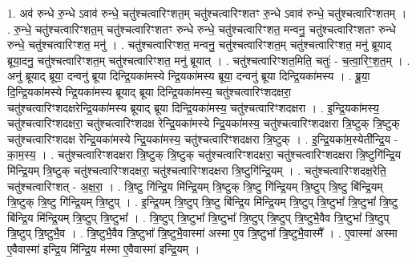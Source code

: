 \documentclass[17pt]{extarticle}
\begin{document}
1. अव॑ रुन्धे रु॒न्धे ऽवाव॑ रुन्धे॒ चतु॑श्चत्वारिꣳशत॒म् चतु॑श्चत्वारिꣳशतꣳ रु॒न्धे ऽवाव॑ रुन्धे॒ चतु॑श्चत्वारिꣳशतम् । . रु॒न्धे॒ चतु॑श्चत्वारिꣳशत॒म् चतु॑श्चत्वारिꣳशतꣳ रुन्धे रुन्धे॒ चतु॑श्चत्वारिꣳशत॒ मन्वनु॒ चतु॑श्चत्वारिꣳशतꣳ रुन्धे रुन्धे॒ चतु॑श्चत्वारिꣳशत॒ मनु॑ । . चतु॑श्चत्वारिꣳशत॒ मन्वनु॒ चतु॑श्चत्वारिꣳशत॒म् चतु॑श्चत्वारिꣳशत॒ मनु॑ ब्रूयाद् ब्रूया॒दनु॒ चतु॑श्चत्वारिꣳशत॒म् चतु॑श्चत्वारिꣳशत॒ मनु॑ ब्रूयात् । . चतु॑श्चत्वारिꣳशत॒मिति॒ चतुः॑ - च॒त्वा॒रिꣳ॒॒श॒त॒म् । . अनु॑ ब्रूयाद् ब्रूया॒ दन्वनु॑ ब्रूया दिन्द्रि॒यका॑मस्ये न्द्रि॒यका॑मस्य ब्रूया॒ दन्वनु॑ ब्रूया दिन्द्रि॒यका॑मस्य । . ब्रू॒या॒ दि॒न्द्रि॒यका॑मस्ये न्द्रि॒यका॑मस्य ब्रूयाद् ब्रूया दिन्द्रि॒यका॑मस्य॒ चतु॑श्चत्वारिꣳशदक्षरा॒ चतु॑श्चत्वारिꣳशदक्षरेन्द्रि॒यका॑मस्य ब्रूयाद् ब्रूया दिन्द्रि॒यका॑मस्य॒ चतु॑श्चत्वारिꣳशदक्षरा । . इ॒न्द्रि॒यका॑मस्य॒ चतु॑श्चत्वारिꣳशदक्षरा॒ चतु॑श्चत्वारिꣳशदक्ष रेन्द्रि॒यका॑मस्ये न्द्रि॒यका॑मस्य॒ चतु॑श्चत्वारिꣳशदक्षरा त्रि॒ष्टुक् त्रि॒ष्टुक् चतु॑श्चत्वारिꣳशदक्ष रेन्द्रि॒यका॑मस्ये न्द्रि॒यका॑मस्य॒ चतु॑श्चत्वारिꣳशदक्षरा त्रि॒ष्टुक् । . इ॒न्द्रि॒यका॑म॒स्येती᳚न्द्रि॒य - का॒म॒स्य॒ । . चतु॑श्चत्वारिꣳशदक्षरा त्रि॒ष्टुक् त्रि॒ष्टुक् चतु॑श्चत्वारिꣳशदक्षरा॒ चतु॑श्चत्वारिꣳशदक्षरा त्रि॒ष्टुगि॑न्द्रि॒य मि॑न्द्रि॒यम् त्रि॒ष्टुक् चतु॑श्चत्वारिꣳशदक्षरा॒ चतु॑श्चत्वारिꣳशदक्षरा त्रि॒ष्टुगि॑न्द्रि॒यम् । . चतु॑श्चत्वारिꣳशदक्ष॒रेति॒ चतु॑श्चत्वारिꣳशत् - अ॒क्ष॒रा॒ । . त्रि॒ष्टु गि॑न्द्रि॒य मि॑न्द्रि॒यम् त्रि॒ष्टुक् त्रि॒ष्टु गि॑न्द्रि॒यम् त्रि॒ष्टुप् त्रि॒ष्टु बि॑न्द्रि॒यम् त्रि॒ष्टुक् त्रि॒ष्टु गि॑न्द्रि॒यम् त्रि॒ष्टुप् । . इ॒न्द्रि॒यम् त्रि॒ष्टुप् त्रि॒ष्टु बि॑न्द्रि॒य मि॑न्द्रि॒यम् त्रि॒ष्टुप् त्रि॒ष्टुभा᳚ त्रि॒ष्टुभा᳚ त्रि॒ष्टु बि॑न्द्रि॒य मि॑न्द्रि॒यम् त्रि॒ष्टुप् त्रि॒ष्टुभा᳚ । . त्रि॒ष्टुप् त्रि॒ष्टुभा᳚ त्रि॒ष्टुभा᳚ त्रि॒ष्टुप् त्रि॒ष्टुप् त्रि॒ष्टुभै॒वैव त्रि॒ष्टुभा᳚ त्रि॒ष्टुप् त्रि॒ष्टुप् त्रि॒ष्टुभै॒व । . त्रि॒ष्टुभै॒वैव त्रि॒ष्टुभा᳚ त्रि॒ष्टुभै॒वास्मा॑ अस्मा ए॒व त्रि॒ष्टुभा᳚ त्रि॒ष्टुभै॒वास्मै᳚ । . ए॒वास्मा॑ अस्मा ए॒वैवास्मा॑ इन्द्रि॒य मि॑न्द्रि॒य म॑स्मा ए॒वैवास्मा॑ इन्द्रि॒यम् । \newline
\end{document}

